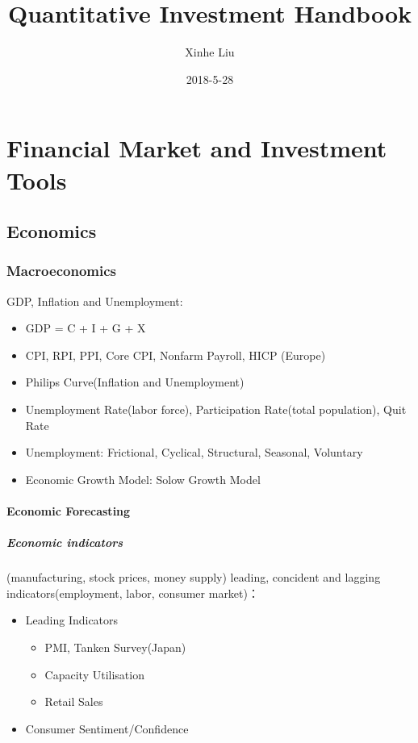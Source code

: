 \documentclass[11pt, openany]{book}              %
\title{\bf Quantitative Investment Handbook}    %
\author{Xinhe Liu}              %
\date{2018-5-28}                           %
\begin{document}
\maketitle                              %
\tableofcontents                        %
\mainmatter                             %

\part{Financial Market and Investment Tools}

\chapter{Economics}

\section{Macroeconomics} 

GDP, Inflation and Unemployment:

\begin{itemize}
    \item GDP = C + I + G + X 
    \item CPI, RPI, PPI, Core CPI, Nonfarm Payroll, HICP (Europe)
    \item Philips Curve(Inflation and Unemployment)
    \item Unemployment Rate(labor force), Participation Rate(total population), Quit Rate 
    \item Unemployment: Frictional, Cyclical, Structural, Seasonal, Voluntary 
    \item Economic Growth Model: Solow Growth Model
\end{itemize}

\subsection{Economic Forecasting}

\subsubsection{Economic indicators}

(manufacturing, stock prices, money supply) leading, concident and lagging indicators(employment, labor, consumer market)：
\begin{itemize}
	\item Leading Indicators \\
	\begin{itemize}
    	\item PMI, Tanken Survey(Japan)
    	\item Capacity Utilisation 
    	\item Retail Sales
	\end{itemize}
	 \item Consumer Sentiment/Confidence 
\end{itemize}
\end{document}
